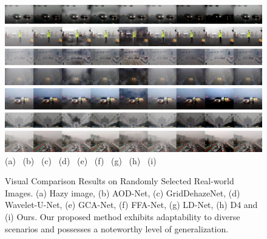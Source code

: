\documentclass[lettersize,journal]{IEEEtran}
\begin{document}
\begin{figure}[pht]
    \centering
    \includegraphics[width=\textwidth]{own_6.jpg}
    \includegraphics[width=\textwidth]{own_8.jpg}
    \includegraphics[width=\textwidth]{own_14.jpg}
    \includegraphics[width=\textwidth]{own_16.jpg}
    \includegraphics[width=\textwidth]{own_19.jpg}
    \includegraphics[width=\textwidth]{own_24.jpg}
    \includegraphics[width=\textwidth]{own_26.jpg}
    (a) \qquad\quad\;\;\;\ (b) \qquad\quad\;\;\;\ (c) \qquad\quad\;\;\;\ (d) \qquad\quad\;\;\;\, (e) \qquad\quad\;\;\;\, (f) \qquad\quad\;\;\;\ (g) \qquad\quad\;\;\;\ (h) \qquad\quad\;\;\;\ (i)
    \caption{Visual Comparison Results on Randomly Selected Real-world Images. (a) Hazy image, (b) AOD-Net\cite{li2017aod}, (c) GridDehazeNet\cite{liu2019griddehazenet}, (d) Wavelet-U-Net\cite{yang2019wavelet}, (e) GCA-Net\cite{chen2019gated}, (f) FFA-Net\cite{qin2020ffa}, (g) LD-Net\cite{ullah2021light}, (h) D4\cite{yang2022d4} and (i) Ours. Our proposed method exhibits adaptability to diverse scenarios and possesses a noteworthy level of generalization.}
    \label{own}
\end{figure}
\end{document}
